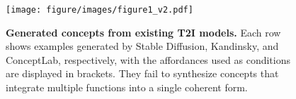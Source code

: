 \begin{figure}
    \centering
    \texttt{[image: figure/images/figure1\_v2.pdf]}
    \caption{\textbf{Generated concepts from existing T2I models.} Each row shows examples generated by Stable Diffusion, Kandinsky, and ConceptLab, respectively, with the affordances used as conditions are displayed in brackets. They fail to synthesize concepts that integrate multiple functions into a single coherent form. }
    \label{fig:example}
\end{figure}